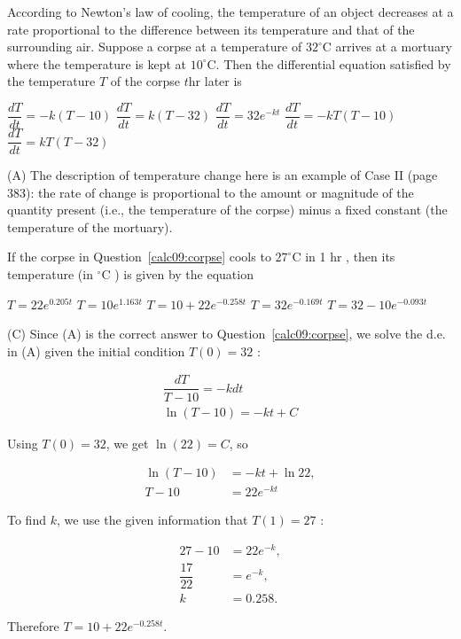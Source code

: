 \newpage



\question\label{calc09:corpse}
According to Newton's law of cooling, the temperature of an object decreases at a rate proportional to the difference between its temperature and that of the surrounding air. Suppose a corpse at a temperature of $32^{\circ} \mathrm{C}$ arrives at a mortuary where the temperature is kept at $10^{\circ} \mathrm{C}$. Then the differential equation satisfied by the temperature $T$ of the corpse $t \mathrm{hr}$ later is
\begin{choices}
  \CorrectChoice $\dfrac{d T}{d t}=-k(T-10)$
  \choice $\dfrac{d T}{d t}=k(T-32)$
  \choice $\dfrac{d T}{d t}=32 e^{-k t}$
  \choice $\dfrac{d T}{d t}=-k T(T-10)$
  \choice $\dfrac{d T}{d t}=k T(T-32)$
\end{choices}
\begin{solution}
(A) The description of temperature change here is an example of Case II (page 383): the rate of change is proportional to the amount or magnitude of the quantity present (i.e., the temperature of the corpse) minus a fixed constant (the temperature of the mortuary).
\end{solution}

\question
If the corpse in Question~\ref{calc09:corpse} cools to $27^{\circ} \mathrm{C}$ in 1 hr , then its temperature (in ${ }^{\circ} \mathrm{C}$ ) is given by the equation
\begin{choices}
  \choice $T=22 e^{0.205 t}$
  \choice $T=10 e^{1.163 t}$
  \CorrectChoice $T=10+22 e^{-0.258 t}$
  \choice $T=32 e^{-0.169 t}$
  \choice $T=32-10 e^{-0.093 t}$

\end{choices}
\begin{solution}
(C) Since (A) is the correct answer to Question~\ref{calc09:corpse}, we solve the d.e. in (A) given the initial condition $T(0)=32$ :

\[
\begin{gathered}
\dfrac{d T}{T-10}=-k d t \\
\ln (T-10)=-k t+C
\end{gathered}
\]

Using $T(0)=32$, we get $\ln (22)=C$, so

\[
\begin{aligned}
\ln (T-10) & =-k t+\ln 22, \\
T-10 & =22 e^{-k t}
\end{aligned}
\]

To find $k$, we use the given information that $T(1)=27$ :

\[
\begin{aligned}
27-10 & =22 e^{-k}, \\
\dfrac{17}{22} & =e^{-k}, \\
k & =0.258 .
\end{aligned}
\]

Therefore $T=10+22 e^{-0.258 t}$.
\end{solution}